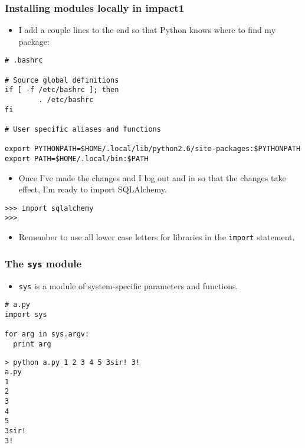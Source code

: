 \documentclass[handout]{beamer}
\numberwithin{equation}{section}
\begin{document}
\begin{frame}[fragile]
\frametitle{Installing modules locally in impact1}

\begin{itemize}
\item I add a couple lines to the end so that Python knows where to find my package:
\end{itemize}

\begin{lstlisting}[name=bashrc]
# .bashrc                                                                                                             

# Source global definitions                                                                                           
if [ -f /etc/bashrc ]; then
        . /etc/bashrc
fi

# User specific aliases and functions                                                                                 

export PYTHONPATH=$HOME/.local/lib/python2.6/site-packages:$PYTHONPATH
export PATH=$HOME/.local/bin:$PATH
\end{lstlisting}
\pause

\begin{itemize}
\item Once I've made the changes and I log out and in so that the changes take effect, I'm ready to import SQLAlchemy.
\end{itemize}

\begin{lstlisting}[name=ex2]
>>> import sqlalchemy
>>>
\end{lstlisting}

\pause
\begin{itemize}
\item Remember to use all lower case letters for libraries in the {\tt import} statement.
\end{itemize}
\end{frame}




\begin{frame}[fragile]
\frametitle{The {\tt sys} module}

\begin{itemize}
\item {\tt sys} is a module of system-specific parameters and functions.
\end{itemize}

\begin{lstlisting}[name=ex2]
# a.py
import sys

for arg in sys.argv:
  print arg
\end{lstlisting}

\pause
\begin{lstlisting}[name=ex2]
> python a.py 1 2 3 4 5 3sir! 3!
a.py
1
2
3
4
5
3sir!
3!
\end{lstlisting}
\end{frame}
\end{document}
